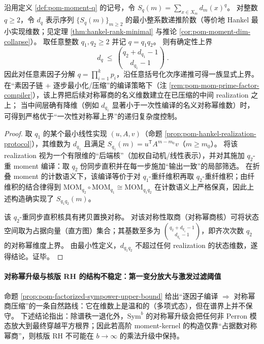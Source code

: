 

\begin{proposition}\label{prop:pom-factorized-sympower-upper-bound}
沿用定义 \ref{def:pom-moment-q} 的记号，令 \(S_q(m)=\sum_{x\in X_m}d_m(x)^q\)。
对整数 \(q\ge 2\)，令 \(d_q\) 表示序列 \(\{S_q(m)\}_{m\ge 2}\) 的最小整系数递推阶数（等价地 Hankel 最小实现维数；见定理 \ref{thm:hankel-rank-minimal} 与推论 \ref{cor:pom-moment-dim-collapse}）。
取任意整数 \(q_1,q_2\ge 2\) 并记 \(q=q_1q_2\)。
则有确定性上界
\[
\boxed{\;
d_{q}\ \le\ \binom{q_2+d_{q_1}-1}{d_{q_1}-1}\; }.
\]
因此对任意素因子分解 \(q=\prod_{i=1}^{k}p_i\)，沿任意括号化次序递推可得一族显式上界。
在“素因子链 + 逐步最小化/压缩”的编译策略下（注 \ref{rem:pom-mom-prime-factor-compiler}），该上界把后续对称幂商的名义维数建立在已压缩的中间 realization 之上；
当中间层确有降维（例如 \(d_{q_1}\) 显著小于一次性编译的名义对称幂维数）时，可得到严格优于“一次性对称幂上界”的递归复杂度控制。
\end{proposition}
\begin{proof}
取 \(q_1\) 的某个最小线性实现 \((u,A,v)\)（命题 \ref{prop:pom-hankel-realization-protocol}），其维数为 \(d_{q_1}\) 且满足
\(
S_{q_1}(m)=u^{\mathsf T}A^{m-m_0}v
\)（\(m\ge m_0\)）。
将该 realization 视为一个有限维的“后端核”（加权自动机/线性表示），并对其施加 \(q_2\)-重 moment 编译：取 \(q_2\) 份同步直积并在每一步施加“输出一致”的局部筛选。
在折叠 moment 的计数语义下，该编译等价于对 \(q_1\)-重纤维积再取 \(q_2\)-重纤维积；由纤维积的结合律得到
\(
\mathrm{MOM}_{q_2}\circ \mathrm{MOM}_{q_1}\cong \mathrm{MOM}_{q_1q_2}
\)
在计数语义上严格保真，因此上述构造确实现了 \(S_{q_1q_2}(m)\)。
\par
该 \(q_2\)-重同步直积核具有拷贝置换对称。
对该对称性取商（对称幂商核）可将状态空间取为占据向量（直方图）集合；其基数至多为
\(\binom{q_2+d_{q_1}-1}{d_{q_1}-1}\)，即齐次次数 \(q_2\) 的对称幂维度上界。
由最小性定义，\(d_{q_1q_2}\) 不超过任何 realization 的状态维数，遂得结论。证毕。
\end{proof}

\paragraph{对称幂升级与核版 RH 的结构不稳定：第一变分放大与激发过滤阈值}
命题 \ref{prop:pom-factorized-sympower-upper-bound} 给出“逐因子编译 \(\Rightarrow\) 对称幂商压缩”的一条自然路线：它在维数上是温和的（多项式态），但在谱界上并不保守。
下述结论指出：除谱秩一退化外，\(\mathrm{Sym}^b\) 的对称幂升级会把任何非 Perron 模态放大到最终穿越平方根界；因此若高阶 moment-kernel 的构造仅靠“占据数对称幂商”，则核版 RH 不可能在 \(b\to\infty\) 的乘法升级中保持。

